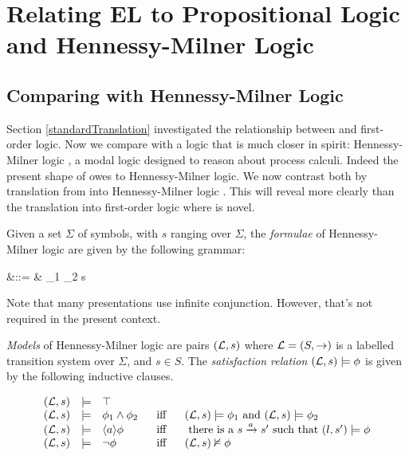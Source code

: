 
\section{Relating EL to Propositional Logic and Hennessy-Milner Logic}

\subsection{Comparing \ELABR{} with Hennessy-Milner Logic}

Section \ref{standardTranslation} investigated the relationship
between \ELABR{} and first-order logic. Now we compare \ELABR{} with a
logic that is much closer in spirit: Hennessy-Milner logic
\cite{HennessyM:alglawfndac}, a modal logic designed to reason about
process calculi. Indeed the present shape of \ELABR{} owes to
Hennessy-Milner logic. We now contrast both by translation from
\ELABR{} into Hennessy-Milner logic .
This will reveal more clearly than the translation into first-order
logic where \ELABR{} is novel.

Given a set $\Sigma$ of symbols, with $s$ ranging over
$\Sigma$, the \emph{formulae} of Hennessy-Milner logic are given
by the following grammar:
\begin{GRAMMAR}
  \phi 
     &\quad ::= \quad & 
  \top \fOr \phi_1 \AND \phi_2 \fOr \langle s \rangle \phi \fOr \neg \phi 
\end{GRAMMAR}

\NI Note that many presentations use infinite conjunction. However,
that's not required in the present context.

 \emph{Models} of Hennessy-Milner logic are pairs $(\mathcal{L}, s)$ where
 $\mathcal{L} = (S, \rightarrow)$ is a labelled transition system over
 $\Sigma$, and $s \in S$.  The \emph{satisfaction relation} $(\mathcal{L}, s)
 \models \phi$ is given by the following inductive clauses.

\[
\begin{array}{lclcl}
  (\mathcal{L}, s) 
     & \models & 
  \top  \\
  (\mathcal{L}, s) 
     & \models & 
  \phi_1 \land \phi_2 &\  \mbox{ iff }\  & (\mathcal{L}, s)  \models \phi_1 \mbox { and } (\mathcal{L}, s) \models \phi_2  \\
  (\mathcal{L}, s) 
     & \models & 
  \langle a \rangle \phi & \mbox{ iff } & \mbox{ there is a } s \xrightarrow{a} s' \mbox { such that } (l,s') \models \phi  \\
  (\mathcal{L}, s) 
     & \models & 
  \neg \phi & \mbox{ iff } & (\mathcal{L}, s)  \nvDash \phi 
\end{array}
\]

